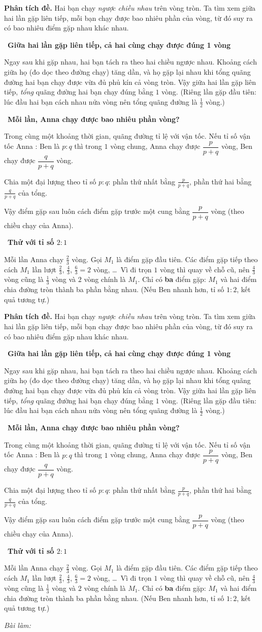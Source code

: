 \documentclass[11pt]{article}
\newif\ifsol \soltrue
\newcommand{\StuProb}[2]{\begin{probboxS}{#1}{#2}\StuProbBody\end{probboxS}}
\newcommand{\probsol}[1]{%
  \begin{lrbox}{\solmeasure}\begin{minipage}{\dimexpr\linewidth-24pt\relax}#1\end{minipage}\end{lrbox}%
  \ifsol
    \begin{solbox}#1\end{solbox}%
  \else
    \setlength{\solht}{\dimexpr\ht\solmeasure+\dp\solmeasure+0.85cm\relax}%
    \ifdim\solht<1.35cm\setlength{\solht}{1.35cm}\fi
    \ifdim\solht>\StudentMaxWork\setlength{\solht}{\StudentMaxWork}\fi
    \par\noindent\begin{minipage}{\linewidth}%
    \expandafter\StuProb\StuProbArgs
    \begin{tcolorbox}[colback=white,colframe=Line,boxrule=0.8pt,arc=5pt,
      left=8pt,right=8pt,top=4pt,bottom=4pt,height=\solht]{\footnotesize\color{Slate}\itshape\WorkWord}\end{tcolorbox}%
    \end{minipage}\par\medskip
  \fi}
\newlength{\StudentMaxWork}\setlength{\StudentMaxWork}{4.5cm}
\newcommand{\step}[2]{\par\smallskip\noindent{\bfseries\color{tmBlue!85!black}\StepWord~#1.}\ {\bfseries #2}\par\nopagebreak}
\def\WorkWord{Bài làm:}
\def\StepWord{Bước}
\begin{document}
\probsol{
\textbf{Phân tích đề.} Hai bạn chạy \emph{ngược chiều nhau} trên vòng tròn. Ta tìm xem giữa hai lần gặp liên tiếp, mỗi bạn chạy được bao nhiêu phần của vòng, từ đó suy ra có bao nhiêu điểm gặp nhau khác nhau.

\step{1}{Giữa hai lần gặp liên tiếp, cả hai cùng chạy được đúng 1 vòng}
\begin{proofbox}Ngay sau khi gặp nhau, hai bạn tách ra theo hai chiều ngược nhau. Khoảng cách giữa họ (đo dọc theo đường chạy) tăng dần, và họ gặp lại nhau khi tổng quãng đường hai bạn chạy được vừa đủ phủ kín cả vòng tròn. Vậy giữa hai lần gặp liên tiếp, \emph{tổng} quãng đường hai bạn chạy đúng bằng $1$ vòng. (Riêng lần gặp đầu tiên: lúc đầu hai bạn cách nhau nửa vòng nên tổng quãng đường là $\frac12$ vòng.)\end{proofbox}

\step{2}{Mỗi lần, Anna chạy được bao nhiêu phần vòng?}
Trong cùng một khoảng thời gian, quãng đường tỉ lệ với vận tốc. Nếu tỉ số vận tốc Anna : Ben là $p:q$ thì trong $1$ vòng chung, Anna chạy được $\dfrac{p}{p+q}$ vòng, Ben chạy được $\dfrac{q}{p+q}$ vòng.
\begin{recallbox}Chia một đại lượng theo tỉ số $p:q$: phần thứ nhất bằng $\frac{p}{p+q}$, phần thứ hai bằng $\frac{q}{p+q}$ của tổng.\end{recallbox}
Vậy điểm gặp sau luôn cách điểm gặp trước một cung bằng $\dfrac{p}{p+q}$ vòng (theo chiều chạy của Anna).

\step{3}{Thử với tỉ số $2:1$}
Mỗi lần Anna chạy $\frac{2}{3}$ vòng. Gọi $M_1$ là điểm gặp đầu tiên. Các điểm gặp tiếp theo cách $M_1$ lần lượt $\frac23$, $\frac43$, $\frac63=2$ vòng, \dots\ Vì đi trọn $1$ vòng thì quay về chỗ cũ, nên $\frac43$ vòng cũng là $\frac13$ vòng và $2$ vòng chính là $M_1$. Chỉ có \textbf{ba} điểm gặp: $M_1$ và hai điểm chia đường tròn thành ba phần bằng nhau. (Nếu Ben nhanh hơn, tỉ số $1:2$, kết quả tương tự.)

}
\end{document}
